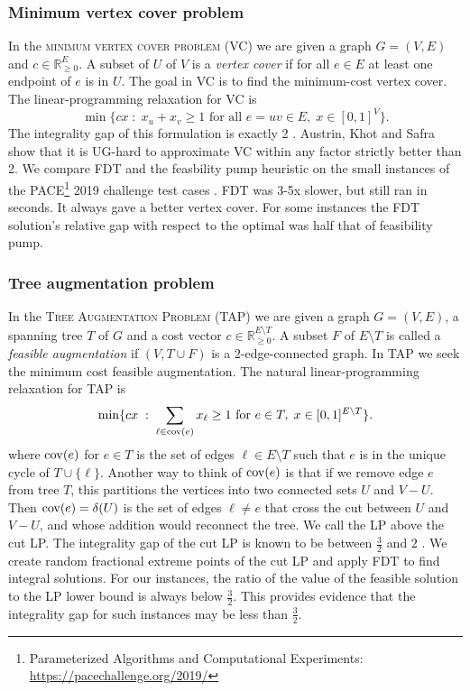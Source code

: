 \subsubsection{Minimum vertex cover problem}

In the \textsc{minimum vertex cover problem (VC)} we are given a graph $G=(V,E)$ and $c\in \mathbb{R}^E_{\geq 0}$. A subset of $U$ of $V$ is a \textit{vertex cover} if for all $e\in E$ at least one endpoint of $e$ is in $U$. The goal in VC is to find the minimum-cost vertex cover. The linear-programming relaxation for VC is
\begin{equation}
\min \{cx \; : \; x_u + x_v \geq	 1 \text{ for all } e=uv \in E, \; x\in [0,1]^{V}\}.
\end{equation}
The integrality gap of this formulation is exactly 2 \cite{davids}. Austrin, Khot and Safra~\cite{UGhardVC} show that it is UG-hard to approximate VC within any factor strictly better than 2. We compare  FDT and the feasbility pump heuristic \cite{fp1} on the small instances of the PACE\footnote{ Parameterized Algorithms and Computational Experiments: \url{https://pacechallenge.org/2019/}} 2019 challenge test cases \cite{PACE}. FDT was 3-5x slower, but still ran in seconds. It always gave a better vertex cover. For some instances the FDT solution's relative gap with respect to the optimal was half that of feasibility pump.
\subsubsection{Tree augmentation problem}
In the \textsc{Tree Augmentation Problem (TAP)} we are given a  graph $G=(V,E)$, a spanning tree $T$ of $G$ and a cost vector $c\in \mathbb{R}^{E\setminus T}_{\geq 0}$. A subset $F$ of $E\setminus T$ is called a \textit{feasible augmentation} if $(V,T\cup F)$ is a 2-edge-connected graph. In TAP we seek the minimum cost feasible augmentation. The natural linear-programming relaxation for TAP is 
\begin{equation}\label{eq:cutLP}
\min \{cx\; : \; \sum_{\ell \in \mathrm{cov}(e)} x_{\ell} \geq 1 \text{ for } e\in T, \; x\in [0,1]^{E\setminus T}\}.
\end{equation}
where $\mathrm{cov}(e)$ for $e \in T$ is the set of edges $\ell \in E\setminus T$ such that $e$ is in the unique cycle of $T\cup \{\ell\}$. Another way to think of $\mathrm{cov}(e)$ is that if we remove edge $e$ from tree $T$, this partitions the vertices into two connected sets $U$ and $V-U$.  Then $\mathrm{cov}(e) = \delta(U)$ is the set of edges $\ell \neq e$ that cross the cut between $U$ and $V-U$, and whose addition would reconnect the tree. We call the LP above the cut LP. The integrality gap of the cut LP is known to be between $\frac{3}{2}$ \cite{32gaptap} and $2$ \cite{FJ81}. We create random fractional extreme points of the cut LP and apply FDT to find integral solutions. For our instances, the ratio of the value of the feasible solution to the LP lower bound is always below $\frac{3}{2}$. This provides evidence that the integrality gap for such instances may be less than $\frac{3}{2}$.

